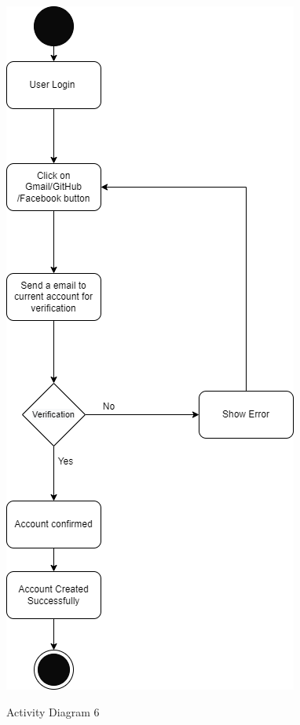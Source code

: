 \begin{figure}[H]
    \centering
    \caption{Activity Diagram 6}
    \includegraphics[scale=0.5]{./diagrams/Activity Diagram/ad-06.png}
    \label{fig:act-06}

\end{figure}


